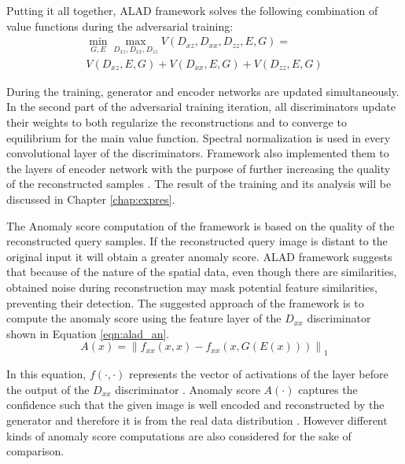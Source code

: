 Putting it all together, ALAD framework solves the following combination of value functions during the adversarial
training:
\begin{equation}
\begin{array}{l}{\min _{G, E} \max _{D_{x z}, D_{x x}, D_{z z}} V\left(D_{x z}, D_{x x}, D_{z z}, E, G\right)=} \\ {V\left(D_{x z}, E, G\right)+V\left(D_{x x}, E, G\right)+V\left(D_{z z}, E, G\right)}\end{array} 
\end{equation}

During the training, generator and encoder networks are updated simultaneously. In the
second part of the adversarial training iteration, all discriminators update their weights to both
regularize the reconstructions and to converge to equilibrium for the main value function. Spectral
normalization is used in every convolutional layer of the discriminators. Framework also implemented
them to the layers of encoder network with the purpose of further increasing the quality of the reconstructed
samples \cite{DBLP:journals/corr/abs-1812-02288}. The result of the training and its analysis will 
be discussed in Chapter \ref{chap:expres}.

The Anomaly score computation of the framework is based on the quality of the reconstructed query
samples. If the reconstructed query image is distant to the original input it will obtain a greater
anomaly score. ALAD framework suggests that because of the nature of the spatial data, even though
there are similarities, obtained noise during reconstruction may mask potential feature
similarities, preventing their detection. The suggested approach of the framework is to compute the
anomaly score using the feature layer of the $D_{xx}$ discriminator shown in Equation
\ref{eqn:alad_an}.
\begin{equation}
  \label{eqn:alad_an}
  A(x)=\left\|f_{x x}(x, x)-f_{x x}(x, G(E(x)))\right\|_{1} 
\end{equation}

In this equation, $f(\cdot, \cdot)$ represents the vector of activations of the layer before the
output of the $D_{xx}$ discriminator \cite{DBLP:journals/corr/abs-1812-02288}. Anomaly score
$A(\cdot)$ captures the confidence such that the given image is well encoded and reconstructed by
the generator and therefore it is from the real data distribution
\cite{DBLP:journals/corr/abs-1812-02288}. However different kinds of anomaly score computations are
also considered for the sake of comparison. 

